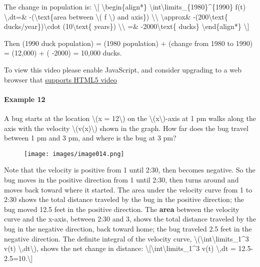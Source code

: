 The change in population is: \textbackslash{}{[}
\textbackslash{}begin\{align*\}
\textbackslash{}int\textbackslash{}limits\_\{1980\}\^{}\{1990\} f(t)
\textbackslash{},dt=\& -(\textbackslash{}text\{area between
\textbackslash{}( f \textbackslash{}) and axis\})
\textbackslash{}\textbackslash{} \textbackslash{}approx\&
-(200\textbackslash{}text\{ ducks/year\})\textbackslash{}cdot
(10\textbackslash{}text\{ years\}) \textbackslash{}\textbackslash{} =\&
-2000\textbackslash{}text\{ ducks\} \textbackslash{}end\{align*\}
\textbackslash{}{]}

Then (1990 duck population) = (1980 population) + (change from 1980 to
1990) = (12,000) + ( -2000) = 10,000 ducks.

To view this video please enable JavaScript, and consider upgrading to a
web browser that \href{http://videojs.com/html5-video-support/}{supports
HTML5 video}

\hypertarget{example-12}{%
\paragraph{Example 12}\label{example-12}}

A bug starts at the location \textbackslash{}(x = 12\textbackslash{}) on
the \textbackslash{}(x\textbackslash{})-axis at 1 pm walks along the
axis with the velocity \textbackslash{}(v(x)\textbackslash{}) shown in
the graph. How far does the bug travel between 1 pm and 3 pm, and where
is the bug at 3 pm?

\begin{figure}
\centering
\texttt{[image: images/image014.png]}
\caption{}
\end{figure}

Note that the velocity is positive from 1 until 2:30, then becomes
negative. So the bug moves in the positive direction from 1 until 2:30,
then turns around and moves back toward where it started. The area under
the velocity curve from 1 to 2:30 shows the total distance traveled by
the bug in the positive direction; the bug moved 12.5 feet in the
positive direction. The \textbf{area} between the velocity curve and the
x-axis, between 2:30 and 3, shows the total distance traveled by the bug
in the negative direction, back toward home; the bug traveled 2.5 feet
in the negative direction. The definite integral of the velocity curve,
\textbackslash{}(\textbackslash{}int\textbackslash{}limits\_1\^{}3 v(t)
\textbackslash{},dt\textbackslash{}), shows the net change in distance:
\textbackslash{}{[}\textbackslash{}int\textbackslash{}limits\_1\^{}3
v(t) \textbackslash{},dt = 12.5-2.5=10.\textbackslash{}{]}

